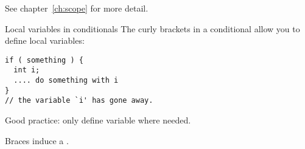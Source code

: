 See chapter~\ref{ch:scope} for more detail.

\begin{slide}{Local variables in conditionals}
  \label{sl:if-scope}
  The curly brackets in a conditional allow you to define local variables:
\begin{lstlisting}
if ( something ) {
  int i; 
  .... do something with i
}
// the variable `i' has gone away.
\end{lstlisting}
Good practice: only define variable where needed.

Braces induce a .
\end{slide}

